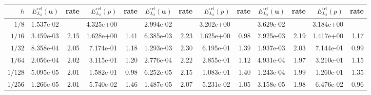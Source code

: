\begin{landscape}
\begin{center}
\begin{tabular}{
r rr rr rr rr rr rr
}
\cmidrule(lr){2-5}\cmidrule(lr){6-9}\cmidrule(lr){10-13}
$h$ & $E^{\mathrm{rel}}_{L_2}(\mathbf{u})$ & rate & $E^{\mathrm{rel}}_{L_2}(p)$ & rate & $E^{\mathrm{rel}}_{L_2}(\mathbf{u})$ & rate & $E^{\mathrm{rel}}_{L_2}(p)$ & rate & $E^{\mathrm{rel}}_{L_2}(\mathbf{u})$ & rate & $E^{\mathrm{rel}}_{L_2}(p)$ & rate \\
\midrule
$1/8$ & 1.537e-02 & -- & 4.325e+00 & -- & 2.994e-02 & -- & 3.202e+00 & -- & 3.629e-02 & -- & 3.184e+00 & -- \\
$1/16$ & 3.459e-03 & 2.15 & 1.628e+00 & 1.41 & 6.385e-03 & 2.23 & 1.625e+00 & 0.98 & 7.925e-03 & 2.19 & 1.417e+00 & 1.17 \\
$1/32$ & 8.358e-04 & 2.05 & 7.174e-01 & 1.18 & 1.293e-03 & 2.30 & 6.195e-01 & 1.39 & 1.937e-03 & 2.03 & 7.144e-01 & 0.99 \\
$1/64$ & 2.056e-04 & 2.02 & 3.115e-01 & 1.20 & 2.776e-04 & 2.22 & 2.855e-01 & 1.12 & 4.931e-04 & 1.97 & 3.210e-01 & 1.15 \\
$1/128$ & 5.095e-05 & 2.01 & 1.582e-01 & 0.98 & 6.252e-05 & 2.15 & 1.083e-01 & 1.40 & 1.243e-04 & 1.99 & 1.260e-01 & 1.35 \\
$1/256$ & 1.266e-05 & 2.01 & 5.740e-02 & 1.46 & 1.487e-05 & 2.07 & 5.231e-02 & 1.05 & 3.158e-05 & 1.98 & 6.476e-02 & 0.96 \\
\bottomrule
\end{tabular}
\end{center}
\vfill
\begin{center}\thepage\end{center}
\clearpage
\end{landscape}
